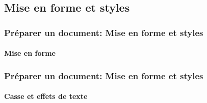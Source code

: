 \documentclass[xcolor=table]{beamer}
\begin{document}
%
%
%



\subsection{Mise en forme et styles}

\begin{frame}
\frametitle{Préparer un document: Mise en forme et styles}
\framesubtitle{Mise en forme}

\begin{minipage}{0.48\textwidth}
\end{minipage}
\begin{minipage}{0.50\textwidth}
%
\end{minipage}

\end{frame}

\begin{frame}
\frametitle{Préparer un document: Mise en forme et styles}
\framesubtitle{Casse et effets de texte}

\begin{minipage}{0.58\textwidth}
\end{minipage}
\begin{minipage}{0.4\textwidth}
%
\end{minipage}

\end{frame}
\end{document}
